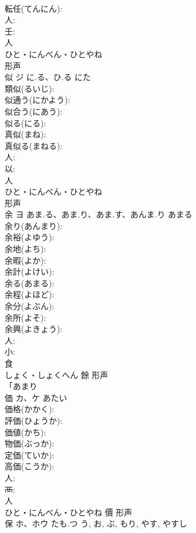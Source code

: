 \documentclass[8pt]{extreport}
\begin{document}
\begin{CJK}{UTF8}{min}
\\	転任(てんにん): 
\\	人: 
\\	壬: 
\\	人	
\\	ひと・にんべん・ひとやね	
\\	形声 
\\	似	ジ	に.る、ひ.る	にた	
\\	類似(るいじ): 
\\	似通う(にかよう): 
\\	似合う(にあう): 
\\	似る(にる): 
\\	真似(まね): 
\\	真似る(まねる): 
\\	人: 
\\	以: 
\\	人	
\\	ひと・にんべん・ひとやね	
\\	形声 
\\	余	ヨ	あま.る、あま.り、あま.す、あんま.り	あまる	
\\	余り(あんまり): 
\\	余裕(よゆう): 
\\	余地(よち): 
\\	余暇(よか): 
\\	余計(よけい): 
\\	余る(あまる): 
\\	余程(よほど): 
\\	余分(よぶん): 
\\	余所(よそ): 
\\	余興(よきょう): 
\\	人: 
\\	小: 
\\	食	
\\	しょく・しょくへん	餘	形声 
\\	「あまり 
\\	価	カ、ケ	あたい		
\\	価格(かかく): 
\\	評価(ひょうか): 
\\	価値(かち): 
\\	物価(ぶっか): 
\\	定価(ていか): 
\\	高価(こうか): 
\\	人: 
\\	襾: 
\\	人	
\\	ひと・にんべん・ひとやね	價	形声 
\\	保	ホ、ホウ	たも.つ	う, お, ぶ, もり, やす, やすし	

\end{CJK}
\end{document}
